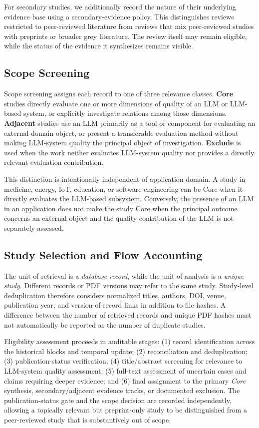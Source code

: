 For secondary studies, we additionally record the nature of their underlying evidence base using a secondary-evidence policy. This distinguishes reviews restricted to peer-reviewed literature from reviews that mix peer-reviewed studies with preprints or broader grey literature. The review itself may remain eligible, while the status of the evidence it synthesizes remains visible.

\subsection{Scope Screening}

Scope screening assigns each record to one of three relevance classes. \textbf{Core} studies directly evaluate one or more dimensions of quality of an LLM or LLM-based system, or explicitly investigate relations among those dimensions. \textbf{Adjacent} studies use an LLM primarily as a tool or component for evaluating an external-domain object, or present a transferable evaluation method without making LLM-system quality the principal object of investigation. \textbf{Exclude} is used when the work neither evaluates LLM-system quality nor provides a directly relevant evaluation contribution.

This distinction is intentionally independent of application domain. A study in medicine, energy, IoT, education, or software engineering can be Core when it directly evaluates the LLM-based subsystem. Conversely, the presence of an LLM in an application does not make the study Core when the principal outcome concerns an external object and the quality contribution of the LLM is not separately assessed.

\subsection{Study Selection and Flow Accounting}

The unit of retrieval is a \emph{database record}, while the unit of analysis is a \emph{unique study}. Different records or PDF versions may refer to the same study. Study-level deduplication therefore considers normalized titles, authors, DOI, venue, publication year, and version-of-record links in addition to file hashes. A difference between the number of retrieved records and unique PDF hashes must not automatically be reported as the number of duplicate studies.

Eligibility assessment proceeds in auditable stages: (1) record identification across the historical blocks and temporal update; (2) reconciliation and deduplication; (3) publication-status verification; (4) title/abstract screening for relevance to LLM-system quality assessment; (5) full-text assessment of uncertain cases and claims requiring deeper evidence; and (6) final assignment to the primary \emph{Core} synthesis, secondary/adjacent evidence tracks, or documented exclusion. The publication-status gate and the scope decision are recorded independently, allowing a topically relevant but preprint-only study to be distinguished from a peer-reviewed study that is substantively out of scope.

